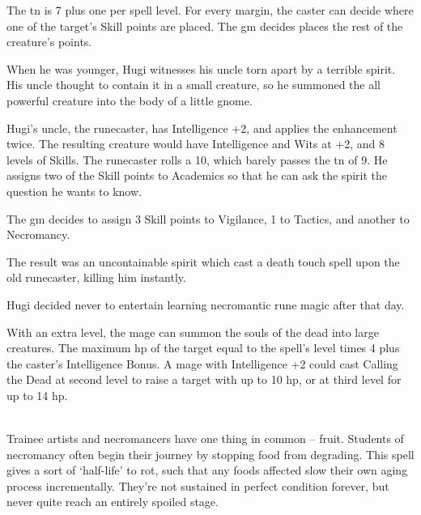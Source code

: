 \documentclass[titlepage,a4paper,openany]{book}
\begin{document}
\begin{multicols}{2}
The \gls{tn} is 7 plus one per spell level.  For every margin, the caster can decide where one of the target's Skill points are placed.  The \gls{gm} decides places the rest of the creature's points.

\begin{exampletext}

	When he was younger, Hugi witnesses his uncle torn apart by a terrible spirit.  His uncle thought to contain it in a small creature, so he summoned the all powerful creature into the body of a little gnome.

	Hugi's uncle, the runecaster, has Intelligence +2, and applies the enhancement twice.  The resulting creature would have Intelligence and Wits at +2, and 8 levels of Skills.  The runecaster rolls a 10, which barely passes the \gls{tn} of 9.  He assigns two of the Skill points to Academics so that he can ask the spirit the question he wants to know.

	The \gls{gm} decides to assign 3 Skill points to Vigilance, 1 to Tactics, and another to Necromancy.

	The result was an uncontainable spirit which cast a death touch spell upon the old runecaster, killing him instantly.

	Hugi decided never to entertain learning necromantic rune magic after that day.

\end{exampletext}


With an extra level, the mage can summon the souls of the dead into large creatures.  The maximum \gls{hp} of the target equal to the spell's level times 4 plus the caster's Intelligence Bonus.
A mage with Intelligence +2 could cast Calling the Dead at second level to raise a target with up to 10 \gls{hp}, or at third level for up to 14 \gls{hp}.

\\
Trainee artists and necromancers have one thing in common -- fruit.  Students of necromancy often begin their journey by stopping food from degrading.  This spell gives a sort of `half-life' to rot, such that any foods affected slow their own aging process incrementally.  They're not sustained in perfect condition forever, but never quite reach an entirely spoiled stage.

\end{multicols}

\end{document}
